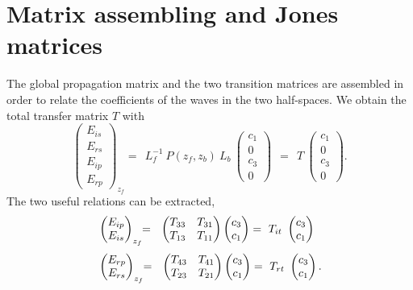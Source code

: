 \section{Matrix assembling and Jones matrices}

The global propagation matrix and the two transition matrices are assembled in order to relate the coefficients of the waves in the two half-spaces.
We obtain the total transfer matrix $T$ with
$$
\begin{pmatrix}
E_{is}\\
E_{rs}\\
E_{ip}\\
E_{rp}
\end{pmatrix}_{z_f}
\!\!
= 
\ \ 
L_f^{-1}\ P(z_f, z_b)\ L_b \ 
\begin{pmatrix}
c_1\\ 0 \\ c_3\\ 0
\end{pmatrix} 
\ \ 
= 
\ \ 
T \ 
\begin{pmatrix}
c_1\\ 0 \\ c_3\\ 0
\end{pmatrix}.
$$
The two useful relations can be extracted,
\begin{align*}
& 
\begin{pmatrix}
E_{ip} \\ E_{is}
\end{pmatrix}_{z_f} \!\! = \ \ 
\begin{pmatrix}
T_{33} & T_{31} \\
T_{13} & T_{11} 
\end{pmatrix}
\begin{pmatrix}
c_3 \\ c_1
\end{pmatrix} = \ T_{it} \ 
\begin{pmatrix}
c_3 \\ c_1
\end{pmatrix}\hphantom{.} 
\\[3pt]
&
\begin{pmatrix}
E_{rp} \\ E_{rs} 
\end{pmatrix}_{z_f} \!\! = \ \ 
\begin{pmatrix}
T_{43} & T_{41} \\
T_{23} & T_{21} 
\end{pmatrix}
\begin{pmatrix}
c_3\\ c_1
\end{pmatrix} =\ T_{rt} \ 
\begin{pmatrix}
c_3\\ c_1
\end{pmatrix}.
\end{align*}

